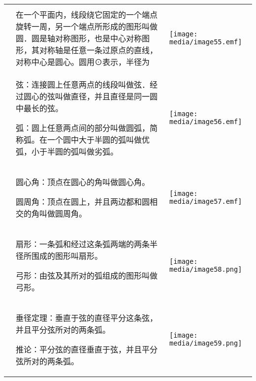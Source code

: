 \documentclass[a4paper,11pt,UTF8]{ctexart}
\begin{document}
\begin{longtable}[]{@{}lll@{}}
\toprule
\endhead
& &\tabularnewline
&
在一个平面内，线段绕它固定的一个端点旋转一周，另一个端点所形成的图形叫做圆．圆是轴对称图形，也是中心对称图形，其对称轴是任意一条过原点的直线，对称中心是圆心。圆用⊙表示，半径为
&
\texttt{[image: media/image55.emf]}\tabularnewline
\begin{minipage}[t]{0.30\columnwidth}\raggedright
\strut
\end{minipage} & \begin{minipage}[t]{0.30\columnwidth}\raggedright
弦：连接圆上任意两点的线段叫做弦．经过圆心的弦叫做直径，并且直径是同一圆中最长的弦。

弧：圆上任意两点间的部分叫做圆弧，简称弧。在一个圆中大于半圆的弧叫做优弧，小于半圆的弧叫做劣弧。\strut
\end{minipage} & \begin{minipage}[t]{0.30\columnwidth}\raggedright
\texttt{[image: media/image56.emf]}\strut
\end{minipage}\tabularnewline
\begin{minipage}[t]{0.30\columnwidth}\raggedright
\strut
\end{minipage} & \begin{minipage}[t]{0.30\columnwidth}\raggedright
圆心角：顶点在圆心的角叫做圆心角。

圆周角：顶点在圆上，并且两边都和圆相交的角叫做圆周角。\strut
\end{minipage} & \begin{minipage}[t]{0.30\columnwidth}\raggedright
\texttt{[image: media/image57.emf]}\strut
\end{minipage}\tabularnewline
\begin{minipage}[t]{0.30\columnwidth}\raggedright
\strut
\end{minipage} & \begin{minipage}[t]{0.30\columnwidth}\raggedright
扇形：一条弧和经过这条弧两端的两条半径所围成的图形叫扇形。

弓形：由弦及其所对的弧组成的图形叫做弓形。\strut
\end{minipage} & \begin{minipage}[t]{0.30\columnwidth}\raggedright
\texttt{[image: media/image58.png]}\strut
\end{minipage}\tabularnewline
\begin{minipage}[t]{0.30\columnwidth}\raggedright
\strut
\end{minipage} & \begin{minipage}[t]{0.30\columnwidth}\raggedright
垂径定理：垂直于弦的直径平分这条弦，并且平分弦所对的两条弧。

推论：平分弦的直径垂直于弦，并且平分弦所对的两条弧。\strut
\end{minipage} & \begin{minipage}[t]{0.30\columnwidth}\raggedright
\texttt{[image: media/image59.png]}\strut
\end{minipage}\tabularnewline
\bottomrule
\end{longtable}
\end{document}
